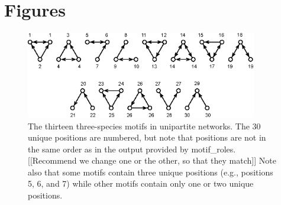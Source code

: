 \documentclass[12pt]{article}
\begin{document}
\clearpage

\section{Figures}

	\begin{figure}[ht]
	  \centering
		\includegraphics*[width=0.9\textwidth]{unipartite_motifs.eps}
		\caption{The thirteen three-species motifs in unipartite networks. The 30 unique positions are numbered, but note that positions are not in the same order as in the output provided by motif\_roles. [[Recommend we change one or the other, so that they match]] Note also that some motifs contain three unique positions (e.g., positions 5, 6, and 7) while other motifs contain only one or two unique positions.}
		\label{fig:3sp_unipartite}
	\end{figure}
\end{document}
